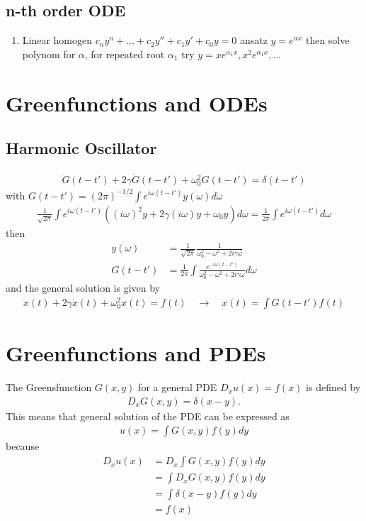 \documentclass[10pt,a4paper]{book}
\theoremstyle{definition}
\begin{document}
\subsection{n-th order ODE}
\begin{enumerate}
\item Linear homogen $c_ny^{n}+...+c_{2}y''+c_{1}y'+c_{0}y=0$ ansatz $y=e^{\alpha x}$ then solve polynom for $\alpha$,  for repeated root $\alpha_1$ try $y=xe^{\alpha_1 x}, x^2e^{\alpha_1 x}, ...$
\end{enumerate}




\section{Greenfunctions and ODEs}
\subsection{Harmonic Oscillator}
\begin{align}
\ddot{G}(t-t')+2\gamma\dot{G}(t-t')+\omega_0^2G(t-t')=\delta(t-t')
\end{align}
with $G(t-t')=(2\pi)^{-1/2}\int e^{i\omega (t-t')}y(\omega)d\omega$
\begin{align}
\frac{1}{\sqrt{2\pi}}\int e^{i\omega (t-t')}\left((i\omega)^2y+2\gamma(i\omega)y+\omega_0y\right)d\omega=\frac{1}{2\pi}\int e^{i\omega(t-t')}d\omega
\end{align}
then
\begin{align}
y(\omega)&=\frac{1}{\sqrt{2\pi}}\frac{1}{\omega_0^2-\omega^2+2i\gamma\omega}\\
G(t-t')&=\frac{1}{2\pi}\int \frac{e^{-i\omega(t-t')}}{\omega_0^2-\omega^2+2i\gamma\omega}d\omega
\end{align}
and the general solution is given by
\begin{align}
\ddot{x}(t)+2\gamma\dot{x}(t)+\omega_0^2x(t)=f(t)\quad\rightarrow\quad
x(t)=\int G(t-t')f(t)
\end{align}

\section{Greenfunctions and PDEs}
The Greensfunction $G(x,y)$ for a general PDE $D_x u(x) = f(x)$ is defined by
\begin{align}
    D_x G(x,y) = \delta(x-y).
\end{align}
This means that general solution of the PDE can be expressed as
\begin{align}
    u(x)=\int G(x,y)f(y)dy
\end{align}
because
\begin{align}
    D_x u(x)
    &=D_x \int G(x,y)f(y)dy\\
    &=\int D_x G(x,y)f(y)dy\\
    &=\int \delta(x-y) f(y)dy\\
    &=f(x)
\end{align}
\end{document}
